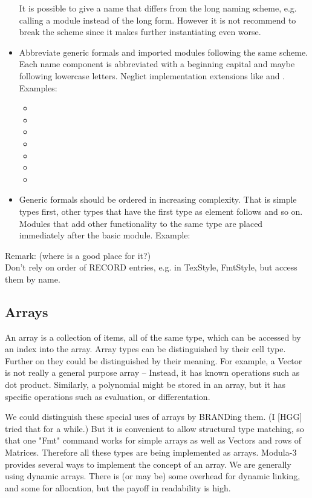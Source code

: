 \begin{itemize}
It is possible to give a name that differs from
the long naming scheme,
e.g. calling a module 
instead of the long form.
However it is not recommend to break the scheme
since it makes further instantiating even worse.
\item Abbreviate generic formals and imported modules following the same scheme.
Each name component is abbreviated with a beginning capital and
maybe following lowercase letters.
Neglict implementation extensions like  and .
Examples:
\begin{itemize}
\item {}
\item {}
\item {}
\item {}
\item {}
\item {}
\item {}
\end{itemize}
\item Generic formals should be ordered in increasing complexity.
That is simple types first,
other types that have the first type as element follows and so on.
Modules that add other functionality to the same type
are placed immediately after the basic module.
Example:
\end{itemize}

Remark: (where is a good place for it?)\\
Don't rely on order of RECORD entries,
e.g. in TexStyle, FmtStyle,
but access them by name.

\subsection{Arrays}
An array is a collection of items, all of the same type,
which can be accessed by an index into the array.
Array types can be distinguished by their cell type.
Further on they could be distinguished by their meaning.
For example, a Vector is not really a general purpose array --
Instead, it has known operations such as dot product.
Similarly, a polynomial might be stored in an array,
but it has specific operations such as evaluation,
or differentation.

We could distinguish these special uses of arrays by
BRANDing them.  (I [HGG] tried that for a while.)
But it is convenient to allow structural type matching,
so that one "Fmt" command works for simple arrays
as well as Vectors and rows of Matrices.
Therefore all these types are being implemented as arrays.
Modula-3 provides several ways to
implement the concept of an array.
We are generally using dynamic arrays.
There is (or may be) some overhead for
dynamic linking, and some for allocation,
but the payoff in readability is high.

